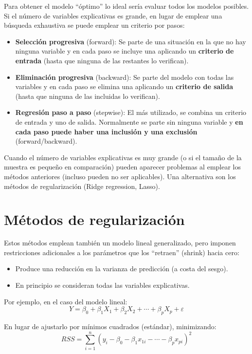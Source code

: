 \documentclass[]{book}
\begin{document}
Para obtener el modelo ``óptimo'' lo ideal sería evaluar todos los
modelos posibles. Si el número de variables explicativas es grande, en
lugar de emplear una búsqueda exhaustiva se puede emplear un criterio
por pasos:

\begin{itemize}
\item
  \textbf{Selección progresiva} (forward): Se parte de una situación en
  la que no hay ninguna variable y en cada paso se incluye una aplicando
  un \textbf{criterio de entrada} (hasta que ninguna de las restantes lo
  verifican).
\item
  \textbf{Eliminación progresiva} (backward): Se parte del modelo con
  todas las variables y en cada paso se elimina una aplicando un
  \textbf{criterio de salida} (hasta que ninguna de las incluidas lo
  verifican).
\item
  \textbf{Regresión paso a paso} (stepwise): El más utilizado, se
  combina un criterio de entrada y uno de salida. Normalmente se parte
  sin ninguna variable y \textbf{en cada paso puede haber una inclusión
  y una exclusión} (forward/backward).
\end{itemize}

Cuando el número de variables explicativas es muy grande (o si el tamaño
de la muestra es pequeño en comparación) pueden aparecer problemas al
emplear los métodos anteriores (incluso pueden no ser aplicables). Una
alternativa son los métodos de regularización (Ridge regression, Lasso).

\section{Métodos de regularización}\label{metodos-de-regularizacion}

Estos métodos emplean también un modelo lineal generalizado, pero
imponen restricciones adicionales a los parámetros que los ``retraen''
(shrink) hacia cero:

\begin{itemize}
\item
  Produce una reducción en la varianza de predicción (a costa del
  sesgo).
\item
  En principio se consideran todas las variables explicativas.
\end{itemize}

Por ejemplo, en el caso del modelo lineal:
\[Y=\beta_{0}+\beta_{1}X_{1}+\beta_{2}X_{2}+\cdots+\beta_{p}X_{p}+\varepsilon\]

En lugar de ajustarlo por mínimos cuadrados (estándar), minimizando:
\[ RSS = \sum\limits_{i=1}^{n}\left(  y_{i} - \beta_0 - \beta_1 x_{1i} - \cdots - \beta_p x_{pi} \right)^{2}\]
\end{document}
